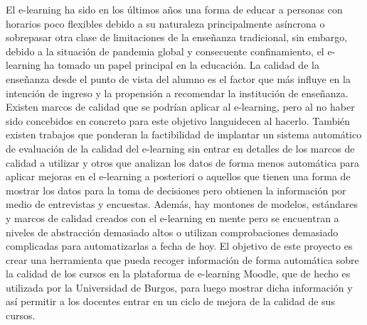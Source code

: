 
El e-learning ha sido en los últimos años una forma de educar a personas con horarios poco flexibles debido a su naturaleza principalmente asíncrona o sobrepasar otra clase de limitaciones de la enseñanza tradicional, sin embargo, debido a la situación de pandemia global y consecuente confinamiento, el e-learning ha tomado un papel principal en la educación.
La calidad de la enseñanza desde el punto de vista del alumno es el factor que más influye en la intención de ingreso y la propensión a recomendar la institución de enseñanza.
Existen marcos de calidad que se podrían aplicar al e-learning, pero al no haber sido concebidos en concreto para este objetivo languidecen al hacerlo.
También existen trabajos que ponderan la factibilidad de implantar un sistema automático de evaluación de la calidad del e-learning sin entrar en detalles de los marcos de calidad a utilizar y otros que analizan los datos de forma menos automática para aplicar mejoras en el e-learning a posteriori o aquellos que tienen una forma de mostrar los datos para la toma de decisiones pero obtienen la información por medio de entrevistas y encuestas.
Además, hay montones de modelos, estándares y marcos de calidad creados con el e-learning en mente pero se encuentran a niveles de abstracción demasiado altos o utilizan comprobaciones demasiado complicadas para automatizarlas a fecha de hoy.
El objetivo de este proyecto es crear una herramienta que pueda recoger información de forma automática sobre la calidad de los cursos en la plataforma de e-learning Moodle, que de hecho es utilizada por la Universidad de Burgos, para luego mostrar dicha información y así permitir a los docentes entrar en un ciclo de mejora de la calidad de sus cursos.
